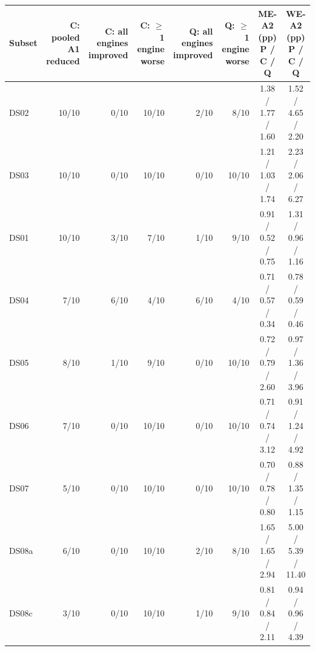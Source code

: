 \begin{tabular}{lrrrrrcc}
\toprule
Subset & \makecell{C: pooled A1\\reduced} & \makecell{C: all engines\\improved} & \makecell{C: $\geq$1 engine\\worse} & \makecell{Q: all engines\\improved} & \makecell{Q: $\geq$1 engine\\worse} & \makecell{ME-A2 (pp)\\P / C / Q} & \makecell{WE-A2 (pp)\\P / C / Q} \\
\midrule
DS02 & 10/10 & 0/10 & 10/10 & 2/10 & 8/10 & 1.38 / 1.77 / 1.60 & 1.52 / 4.65 / 2.20 \\
DS03 & 10/10 & 0/10 & 10/10 & 0/10 & 10/10 & 1.21 / 1.03 / 1.74 & 2.23 / 2.06 / 6.27 \\
\midrule
DS01 & 10/10 & 3/10 & 7/10 & 1/10 & 9/10 & 0.91 / 0.52 / 0.75 & 1.31 / 0.96 / 1.16 \\
DS04 & 7/10 & 6/10 & 4/10 & 6/10 & 4/10 & 0.71 / 0.57 / 0.34 & 0.78 / 0.59 / 0.46 \\
DS05 & 8/10 & 1/10 & 9/10 & 0/10 & 10/10 & 0.72 / 0.79 / 2.60 & 0.97 / 1.36 / 3.96 \\
DS06 & 7/10 & 0/10 & 10/10 & 0/10 & 10/10 & 0.71 / 0.74 / 3.12 & 0.91 / 1.24 / 4.92 \\
DS07 & 5/10 & 0/10 & 10/10 & 0/10 & 10/10 & 0.70 / 0.78 / 0.80 & 0.88 / 1.35 / 1.15 \\
DS08a & 6/10 & 0/10 & 10/10 & 2/10 & 8/10 & 1.65 / 1.65 / 2.94 & 5.00 / 5.39 / 11.40 \\
DS08c & 3/10 & 0/10 & 10/10 & 1/10 & 9/10 & 0.81 / 0.84 / 2.11 & 0.94 / 0.96 / 4.39 \\
\bottomrule
\end{tabular}
